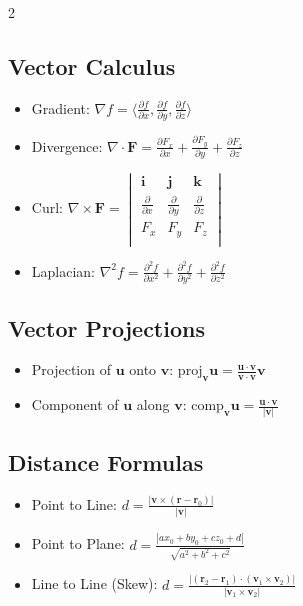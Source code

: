 \begin{multicols}{2}
\subsection*{Vector Calculus}
\begin{itemize}
\item Gradient: $\nabla f = \langle \frac{\partial f}{\partial x}, \frac{\partial f}{\partial y}, \frac{\partial f}{\partial z} \rangle$
\item Divergence: $\nabla \cdot \mathbf{F} = \frac{\partial F_x}{\partial x} + \frac{\partial F_y}{\partial y} + \frac{\partial F_z}{\partial z}$
\item Curl: $\nabla \times \mathbf{F} = \begin{vmatrix}
\mathbf{i} & \mathbf{j} & \mathbf{k} \\
\frac{\partial}{\partial x} & \frac{\partial}{\partial y} & \frac{\partial}{\partial z} \\
F_x & F_y & F_z \\
\end{vmatrix}$
\item Laplacian: $\nabla^2 f = \frac{\partial^2 f}{\partial x^2} + \frac{\partial^2 f}{\partial y^2} + \frac{\partial^2 f}{\partial z^2}$
\end{itemize}

\subsection*{Vector Projections}
\begin{itemize}
\item Projection of $\mathbf{u}$ onto $\mathbf{v}$: $\text{proj}_{\mathbf{v}}\mathbf{u} = \frac{\mathbf{u} \cdot \mathbf{v}}{\mathbf{v} \cdot \mathbf{v}}\mathbf{v}$
\item Component of $\mathbf{u}$ along $\mathbf{v}$: $\text{comp}_{\mathbf{v}}\mathbf{u} = \frac{\mathbf{u} \cdot \mathbf{v}}{|\mathbf{v}|}$
\end{itemize}

\subsection*{Distance Formulas}
\begin{itemize}
\item Point to Line: $d = \frac{|\mathbf{v} \times (\mathbf{r} - \mathbf{r}_0)|}{|\mathbf{v}|}$
\item Point to Plane: $d = \frac{|ax_0 + by_0 + cz_0 + d|}{\sqrt{a^2 + b^2 + c^2}}$
\item Line to Line (Skew): $d = \frac{|(\mathbf{r}_2 - \mathbf{r}_1) \cdot (\mathbf{v}_1 \times \mathbf{v}_2)|}{|\mathbf{v}_1 \times \mathbf{v}_2|}$
\end{itemize}

\end{multicols}


